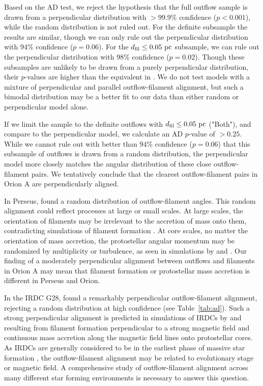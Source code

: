 \documentclass[twocolumn]{aastex63}
\begin{document}
Based on the AD test, we reject the hypothesis that the full outflow sample is drawn from a perpendicular distribution with $>99.9\%$ confidence ($p < 0.001$), while the random distribution is not ruled out. For the definite subsample the results are similar, though we can only rule out the perpendicular distribution with $94\%$ confidence ($p = 0.06$). For the $d_{\rm fil} \leq 0.05~\rm{pc}$ subsample, we can rule out the perpendicular distribution with $98\%$ confidence ($p = 0.02$). Though these subsamples are unlikely to be drawn from a purely perpendicular distribution, their $p$-values are higher than the equivalent in \citet{Stephens17}. We do not test models with a mixture of perpendicular and parallel outflow-filament alignment, but such a bimodal distribution may be a better fit to our data than either random or perpendicular model alone.

If we limit the sample to the definite outflows with $d_{\rm fil} \leq 0.05~\rm{pc}$ ("Both"), and compare to the perpendicular model, we calculate an AD $p$-value of $> 0.25$. While we cannot rule out with better than $94\%$ confidence ($p = 0.06$) that this subsample of outflows is drawn from a random distribution, the perpendicular model more closely matches the angular distribution of these close outflow-filament pairs. We tentatively conclude that the clearest outflow-filament pairs in Orion A are perpendicularly aligned.

In Perseus, \citet{Stephens17} found a random distribution of outflow-filament angles. This random alignment could reflect processes at large or small scales. At large scales, the orientation of filaments may be irrelevant to the accretion of mass onto them, contradicting simulations of filament formation \citep[e.g.][]{Chen14,Clarke17}. At core scales, no matter the orientation of mass accretion, the protostellar angular momentum may be randomized by multiplicity or turbulence, as seen in simulations by \citet{Offner16} and \citet{Lee17}. Our finding of a moderately perpendicular alignment between outflows and filaments in Orion A may mean that filament formation or protostellar mass accretion is different in Perseus and Orion.

In the IRDC G28, \citet{Kong19} found a remarkably perpendicular outflow-filament alignment, rejecting a random distribution at high confidence (see Table~\ref{tab:ad}). Such a strong perpendicular alignment is predicted in simulations of IRDCs by \citet{Li18} and \citet{Li19} resulting from filament formation perpendicular to a strong magnetic field and continuous mass accretion along the magnetic field lines onto protostellar cores. As IRDCs are generally considered to be in the earliest phase of massive star formation \citep{Rathborne06}, the outflow-filament alignment may be related to evolutionary stage or magnetic field. A comprehensive study of outflow-filament alignment across many different star forming environments is necessary to answer this question.
\end{document}

